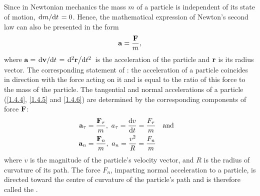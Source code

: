 \subsection{}\label{2.4.3} Since in Newtonian mechanics the mass $m$ of a particle is independent of its state of motion, $\dv*{m}{t} = 0$. Hence, the mathematical expression of Newton's second law can also be presented in the form
\begin{equation*}%
\vb{a} = \frac{\vb{F}}{m},
\end{equation*}
where $\vb{a} = \dv*{\vb{v}}{t} = \dv*[2]{\vb{r}}{t}$ is the acceleration of the particle and $\vb{r}$ is its radius vector. The corresponding statement of : the acceleration of a particle coin­cides in direction with the force acting on it and is equal to the ratio of this force to the mass of the particle. The tangential and normal accelerations of a particle (\ref{1.4.4}, \ref{1.4.5} and \ref{1.4.6}) are determined by the corresponding compo­nents of force $\vb{F}$:
\begin{align*}%
\vb{a}_{\tau} & = \frac{\vb{F}_{\tau}}{m}, \,\, a_{\tau} = \dv{v}{t} = \frac{F_{\tau}}{m} \qand \\
\vb{a}_{n} & = \frac{\vb{F}_{n}}{m}, \,\, a_{n} = \frac{v^{2}}{R} = \frac{F_{n}}{m}
\end{align*}
where $v$ is the magnitude of the particle's velocity vector, and $R$ is the radius of curvature of its path. The force $F_{n}$, imparting normal acceleration to a particle, is directed toward the centre of curvature  of the particle's path and is therefore called the .


